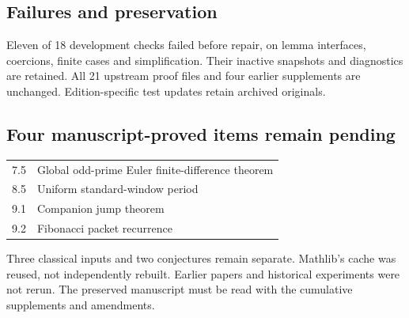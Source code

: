 \documentclass[11pt]{article}
\begin{document}
\subsection*{Failures and preservation}
Eleven of 18 development checks failed before repair, on lemma interfaces, coercions, finite cases and simplification. Their inactive snapshots and diagnostics are retained. All 21 upstream proof files and four earlier supplements are unchanged. Edition-specific test updates retain archived originals.

\subsection*{Four manuscript-proved items remain pending}
\begin{center}
\begin{tabular}{@{}lp{}@{}}
7.5 & Global odd-prime Euler finite-difference theorem\\
8.5 & Uniform standard-window period\\
9.1 & Companion jump theorem\\
9.2 & Fibonacci packet recurrence\\
\end{tabular}
\end{center}
Three classical inputs and two conjectures remain separate. Mathlib's cache was reused, not independently rebuilt. Earlier papers and historical experiments were not rerun. The preserved manuscript must be read with the cumulative supplements and amendments.
\end{document}
